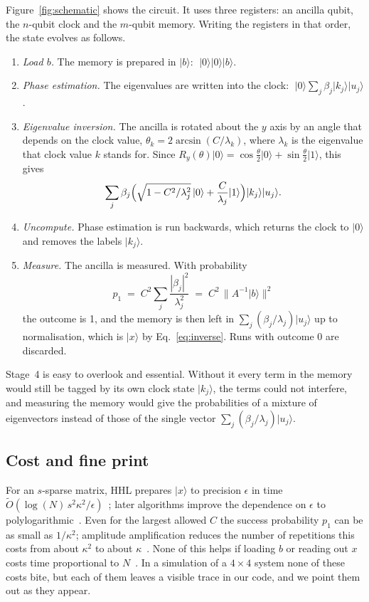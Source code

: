 \documentclass[manuscript,screen,review,nonacm]{acmart}
\newcommand{\ket}[1]{\lvert #1\rangle}
\newcommand{\norm}[1]{\lVert #1\rVert}
\begin{document}
Figure~\ref{fig:schematic} shows the circuit. It uses three registers: an
ancilla qubit, the $n$-qubit clock and the $m$-qubit memory. Writing the
registers in that order, the state evolves as follows.
\begin{enumerate}
\item \emph{Load $b$.} The memory is prepared in $\ket{b}$:
  $\;\ket{0}\ket{0}\ket{b}$.
\item \emph{Phase estimation.} The eigenvalues are written into the clock:
  $\;\ket{0}\sum_j\beta_j\ket{k_j}\ket{u_j}$.
\item \emph{Eigenvalue inversion.} The ancilla is rotated about the $y$ axis
  by an angle that depends on the clock value, $\theta_k=2\arcsin(C/\lambda_k)$,
  where $\lambda_k$ is the eigenvalue that clock value $k$ stands for. Since
  $R_y(\theta)\ket{0}=\cos\tfrac{\theta}{2}\ket{0}+\sin\tfrac{\theta}{2}\ket{1}$,
  this gives
  \begin{equation}
    \sum_j\beta_j\Bigl(\sqrt{1-C^2/\lambda_j^2}\,\ket{0}
      +\frac{C}{\lambda_j}\ket{1}\Bigr)\ket{k_j}\ket{u_j}.
    \label{eq:rotation}
  \end{equation}
\item \emph{Uncompute.} Phase estimation is run backwards, which returns the
  clock to $\ket{0}$ and removes the labels $\ket{k_j}$.
\item \emph{Measure.} The ancilla is measured. With probability
  \begin{equation}
    p_1 \;=\; C^2\sum_j\frac{|\beta_j|^2}{\lambda_j^2}
        \;=\; C^2\,\norm{A^{-1}\ket{b}}^2
    \label{eq:psuccess}
  \end{equation}
  the outcome is 1, and the memory is then left in
  $\sum_j(\beta_j/\lambda_j)\ket{u_j}$ up to normalisation, which is
  $\ket{x}$ by Eq.~\eqref{eq:inverse}. Runs with outcome 0 are discarded.
\end{enumerate}
Stage~4 is easy to overlook and essential. Without it every term in the
memory would still be tagged by its own clock state $\ket{k_j}$, the terms
could not interfere, and measuring the memory would give the probabilities of
a mixture of eigenvectors instead of those of the single vector
$\sum_j(\beta_j/\lambda_j)\ket{u_j}$.

\subsection{Cost and fine print}

For an $s$-sparse matrix, HHL prepares $\ket{x}$ to precision $\epsilon$ in
time $\tilde{O}(\log(N)\,s^2\kappa^2/\epsilon)$~\cite{harrow2009}; later
algorithms improve the dependence on $\epsilon$ to
polylogarithmic~\cite{childs2017}. Even for the largest allowed $C$ the success
probability $p_1$ can be as small as $1/\kappa^2$; amplitude amplification
reduces the number of repetitions this costs from about $\kappa^2$ to about
$\kappa$~\cite{brassard2002,harrow2009}. None of this helps if loading
$b$ or reading out $x$ costs time proportional to $N$~\cite{aaronson2015}.
In a simulation of a $4\times 4$ system none of these costs bite, but each of
them leaves a visible trace in our code, and we point them out as they appear.
\end{document}
